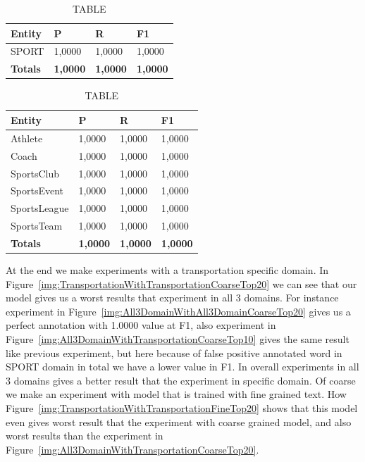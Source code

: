 \documentclass[thesis=M,english]{FITthesis}[2018/05/30]
\begin{document}
	\begin{table}[H]\centering
		\caption{TABLE}
		\label{}
		\begin{tabular}{|l|l|l|l|}
			\hline {\textbf{Entity}} & {\textbf{P}} & {\textbf{R}} & {\textbf{F1}}\\\hline
				SPORT & 1,0000 & 1,0000 & 1,0000\\\hline
				\textbf{Totals} & \textbf{1,0000} & \textbf{1,0000} & \textbf{1,0000}\\\hline
		\end{tabular}
	\end{table}	
	
	\begin{table}[H]\centering
		\caption{TABLE}
		\label{}
		\begin{tabular}{|l|l|l|l|}
			\hline {\textbf{Entity}} & {\textbf{P}} & {\textbf{R}} & {\textbf{F1}}\\\hline
				Athlete & 1,0000 & 1,0000 & 1,0000\\
				Coach & 1,0000 & 1,0000 & 1,0000\\
				SportsClub & 1,0000 & 1,0000 & 1,0000\\
				SportsEvent & 1,0000 & 1,0000 & 1,0000\\
				SportsLeague & 1,0000 & 1,0000 & 1,0000\\
				SportsTeam & 1,0000 & 1,0000 & 1,0000\\\hline
				\textbf{Totals} & \textbf{1,0000} & \textbf{1,0000} & \textbf{1,0000}\\\hline
		\end{tabular}
	\end{table}	
	
	At the end we make experiments with a transportation specific domain. In Figure~\ref{img:TransportationWithTransportationCoarseTop20} we can see that our model gives us a worst results that experiment in all 3 domains. For instance experiment in Figure~\ref{img:All3DomainWithAll3DomainCoarseTop20} gives us a perfect annotation with 1.0000 value at F1, also experiment in Figure~\ref{img:All3DomainWithTransportationCoarseTop10} gives the same result like previous experiment, but here because of false positive annotated word in SPORT domain in total we have a lower value in F1. In overall experiments in all 3 domains gives a better result that the experiment in specific domain.
	Of coarse we make an experiment with model that is trained with fine grained text. How Figure~\ref{img:TransportationWithTransportationFineTop20} shows that this model even gives worst result that the experiment with coarse grained model, and also worst results than the experiment in Figure~\ref{img:All3DomainWithTransportationCoarseTop20}.		
	
\end{document}
